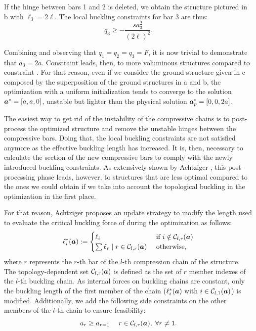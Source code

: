 If the hinge between bars 1 and 2 is deleted, we obtain the structure pictured in b with $\ell_3=2\ell$. The local buckling constraints for bar 3 are thus:
\begin{equation}
    q_3\geq -\frac{s a_3^2}{(2\ell)^2}.
    \label{eq:04_chain_2}
\end{equation}

Combining   and observing that $q_1=q_2=q_3=F$, it is now trivial to demonstrate that $a_3=2a$. Constraint  leads, then, to more voluminous structures compared to constraint . For that reason, even if we consider the ground structure given in c composed by the superposition of the ground structures in a and b, the optimization with a uniform initialization tends to converge to the solution $\bm{a}^*=[a,a,0]$, unstable but lighter than the physical solution $\bm{a}_p^*=[0,0,2a]$. 

The easiest way to get rid of the instability of the compressive chains is to post-process the optimized structure and remove the unstable hinges between the compressive bars. Doing that, the local buckling constraints are not satisfied anymore as the effective buckling length has increased. It is, then, necessary to calculate the section of the new compressive bars to comply with the newly introduced buckling constraints. As extensively shown by Achtziger , this post-processing phase leads, however, to structures that are less optimal compared to the ones we could obtain if we take into account the topological buckling in the optimization in the first place.

For that reason, Achtziger proposes an update strategy to modify the length used to evaluate the critical buckling force of  during the optimization as follows:
\begin{equation}
    \ell^*_i(\bm{a}):= 
    \begin{cases}
        \ell_i & \text { if } i \notin \mathcal{C}_{l,r}(\bm{a}) \\
        \sum \ell_{r} \;|\; r \in \mathcal{C}_{l,r}(\bm{a})  & \text { otherwise,}
    \end{cases}
    \label{eq:04_chain_len}
\end{equation}
where $r$ represents the $r$-th bar of the $l$-th compression chain of the structure. The topology-dependent set $\mathcal{C}_{l,r}(\bm{a})$ is defined as the set of $r$ member indexes of the $l$-th buckling chain. As internal forces on buckling chains are constant, only the buckling length of the first member of the chain ($\ell^*_i(\bm{a}) \text{ with } i \in \mathcal{C}_{l,1}(\bm{a})$) is modified. Additionally, we add the following side constraints on the other members of the $l$-th chain to ensure feasibility:
\begin{equation}
    a_{r}\geq a_{r=1} \quad \; r \in \mathcal{C}_{l,r}(\bm{a}), \; \forall r \neq 1.
    \label{eq:04_side_cons_chain}
\end{equation}

